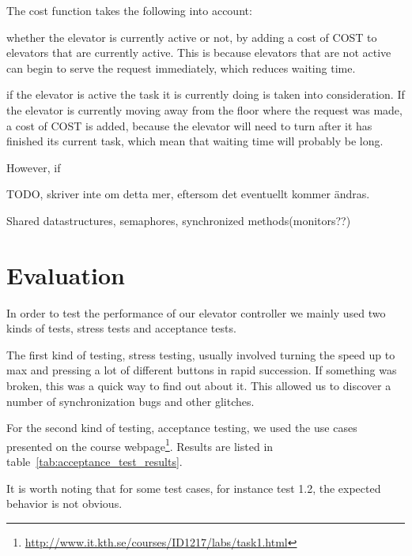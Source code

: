\documentclass[a4paper]{article}
\begin{document}
The cost function takes the following into account: 

whether the elevator is currently active or not, by adding a cost of COST to elevators that are currently active. This is because elevators that are not active can begin to serve the request immediately, which reduces waiting time.

if the elevator is active the task it is currently doing is taken into consideration. If the elevator is currently moving away from the floor where the request was made, a cost of COST is added, because the elevator will need to turn after it has finished its current task, which mean that waiting time will probably be long.

However, if

TODO, skriver inte om detta mer, eftersom det eventuellt kommer ändras.


 


Shared datastructures, semaphores, synchronized methods(monitors??)


\section{Evaluation}

In order to test the performance of our elevator controller we mainly used two
kinds of tests, stress tests and acceptance tests.

The first kind of testing, stress testing, usually involved turning the speed up
to max and pressing a lot of different buttons in rapid succession. If something
was broken, this was a quick way to find out about it. This allowed us to
discover a number of synchronization bugs and other glitches.

For the second kind of testing, acceptance testing, we used the use cases
presented on the course
webpage\footnote{\url{http://www.it.kth.se/courses/ID1217/labs/task1.html}}.
Results are listed in table~\ref{tab:acceptance_test_results}.

It is worth noting that for some test cases, for instance test 1.2, the expected
behavior is not obvious.
\end{document}
